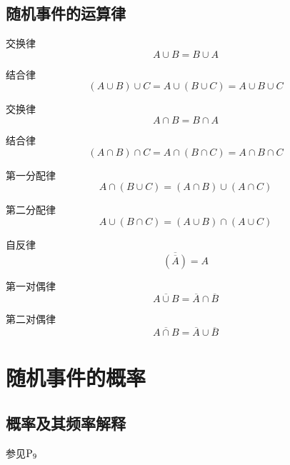 \subsection{随机事件的运算律}
\dya[求和运算]\jg
\par \quad 交换律
\begin{equation}
A \cup B =B \cup A
\end{equation}
\par \quad 结合律
\begin{equation}
(A \cup B)\cup C =A\cup (B\cup C)=A\cup B\cup C
\end{equation}
\dya[求交运算]\jg
\par \quad 交换律
\begin{equation}
A\cap B=B\cap A
\end{equation}
\par \quad 结合律
\begin{equation}
(A \cap B)\cap C=A\cap (B\cap C)=A \cap B \cap C
\end{equation}
\dya[混合运算]\jg
\par \quad 第一分配律
\begin{equation}
A \cap (B \cup C)=(A\cap B)\cup (A \cap C)
\end{equation}
\par \quad 第二分配律
\begin{equation}
A \cup (B \cap C)=(A\cup B)\cap (A \cup C)
\end{equation}
\dya[求对立事件的运算]\jg
\par \quad 自反律
\begin{equation}
\overline{(\overline{A})}=A
\end{equation}
\dya[求和及交事件的对立事件]\jg
\par \quad 第一对偶律
\begin{equation}
\overline{A \cup B}=\overline{A} \cap \overline{B} 
\end{equation}
\par \quad 第二对偶律
\begin{equation}
\overline{A \cap B}=\overline{A} \cup \overline{B} 
\end{equation}

\section{随机事件的概率}
\subsection{概率及其频率解释}
参见$\rm{P}_9$
